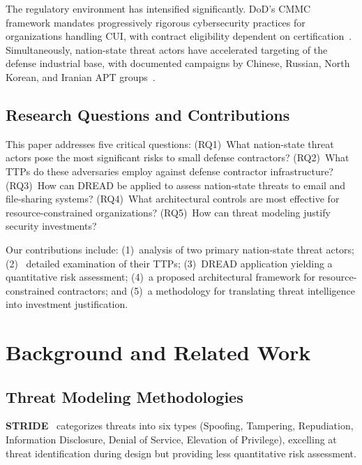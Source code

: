 \documentclass[sigconf,nonacm]{acmart}
\begin{document}
The regulatory environment has intensified significantly. DoD's CMMC framework mandates
progressively rigorous cybersecurity practices for organizations handling CUI, with
contract eligibility dependent on certification~\cite{dod2024cmmc}. Simultaneously,
nation-state threat actors have accelerated targeting of the defense industrial base,
with documented campaigns by Chinese, Russian, North Korean, and Iranian APT
groups~\cite{cisa2024nationstate}.

\subsection{Research Questions and Contributions}

This paper addresses five critical questions: (RQ1)~What nation-state threat actors pose
the most significant risks to small defense contractors? (RQ2)~What TTPs do these
adversaries employ against defense contractor infrastructure? (RQ3)~How can DREAD be
applied to assess nation-state threats to email and file-sharing systems?
(RQ4)~What architectural controls are most effective for resource-constrained
organizations? (RQ5)~How can threat modeling justify security investments?

Our contributions include: (1)~analysis of two primary nation-state threat actors; (2)~
detailed examination of their TTPs; (3)~DREAD application yielding a quantitative risk
assessment; (4)~a proposed architectural framework for resource-constrained contractors;
and (5)~a methodology for translating threat intelligence into investment justification.

\section{Background and Related Work}

\subsection{Threat Modeling Methodologies}

\textbf{STRIDE}~\cite{shostack2014threat} categorizes threats into six types
(Spoofing, Tampering, Repudiation, Information Disclosure, Denial of Service, Elevation
of Privilege), excelling at threat identification during design but providing less
quantitative risk assessment.
\end{document}
